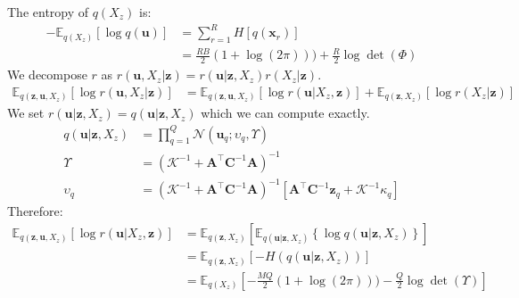 \documentclass[12pt]{article}
\newcommand{\Kappa}{\mathcal{K}}
\newcommand{\xb}{\mathbf{x}}
\newcommand{\ub}{\mathbf{u}}
\newcommand{\zb}{\mathbf{z}}
\newcommand{\Cb}{\mathbf{C}}
\newcommand{\Ab}{\mathbf{A}}
\newcommand{\Kuu}{\mathbf{K}_{uu}}
\newcommand{\Ex}{\mathbb{E}}
\begin{document}
%
The entropy of $q(X_z)$ is:
%
\begin{align}
-\Ex_{q(X_z)}\left[\log q(\ub)\right] &= \sum_{r=1}^R H[q(\xb_r)] \\
&= \frac{RB}{2}(1+\log(2\pi))) + \frac{R}{2}\log\det(\Phi)
\end{align}
%
We decompose $r$ as $r(\ub,X_z|\zb) = r(\ub|\zb,X_z)r(X_z|\zb)$.
%
\begin{align}
\Ex_{q(\zb,\ub,X_z)}\left[\log r(\ub,X_z|\zb)\right] &= \Ex_{q(\zb,\ub,X_z)}\left[\log r(\ub|X_z,\zb)\right] + \Ex_{q(\zb,X_z)}\left[\log r(X_z|\zb)\right]
\end{align}
%
We set $r(\ub|\zb,X_z) = q(\ub|\zb,X_z)$ which we can compute exactly.
%
\begin{align}
q(\ub|\zb,X_z) &= \prod_{q=1}^Q \mathcal{N}(\ub_q; \upsilon_q, \Upsilon) \\
\Upsilon &= (\Kappa^{-1} + \Ab^\top\Cb^{-1}\Ab)^{-1} \\
\upsilon_q &= (\Kappa^{-1} + \Ab^\top\Cb^{-1}\Ab)^{-1}[\Ab^\top \Cb^{-1}\zb_q + \Kappa^{-1}\kappa_q]
\end{align}
%
Therefore:
%
\begin{align}
\Ex_{q(\zb,\ub,X_z)}\left[\log r(\ub|X_z,\zb)\right] &= \Ex_{q(\zb,X_z)}\left[ \Ex_{q(\ub|\zb,X_z)} \left\{\log q(\ub|\zb,X_z) \right\} \right] \\
&= \Ex_{q(\zb,X_z)}\left[-H(q(\ub|\zb,X_z)) \right] \\
&= \Ex_{q(X_z)}\left[-\frac{MQ}{2}(1+\log(2\pi))) -\frac{Q}{2}\log\det(\Upsilon) \right]
\end{align}
%
\end{document}
